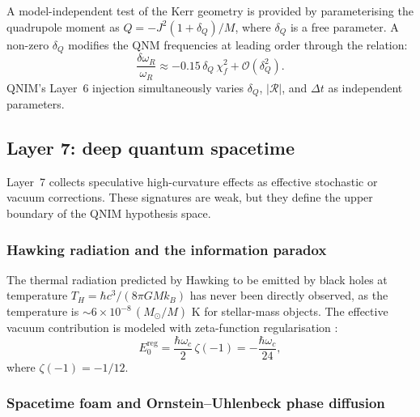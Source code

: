 \documentclass[11pt,a4paper, english]{book}
\theoremstyle{plain}
\theoremstyle{definition}
\numberwithin{equation}{chapter}
\numberwithin{figure}{chapter}
\numberwithin{table}{chapter}
\begin{document}
A model-independent test of the Kerr geometry is provided by parameterising
the quadrupole moment as $Q = -J^2(1+\delta_Q)/M$, where $\delta_Q$ is a
free parameter.  A non-zero $\delta_Q$ modifies the QNM frequencies at
leading order through the relation:
\begin{equation}
  \label{eq:nohair_deviation}
  \frac{\delta\omega_R}{\omega_R} \approx -0.15\,\delta_Q\,\chi_f^2
    + \mathcal{O}(\delta_Q^2).
\end{equation}
QNIM's Layer~6 injection simultaneously varies $\delta_Q$, $|\mathcal{R}|$,
and $\Delta t$ as independent parameters.

\subsection{Layer 7: deep quantum spacetime}
\label{subsec:layer7}

Layer~7 collects speculative high-curvature effects as effective stochastic or vacuum corrections. These signatures are weak, but they define the upper boundary of the QNIM hypothesis space.

\subsubsection{Hawking radiation and the information paradox}

The thermal radiation predicted by Hawking \citeyear{Hawking_1975} to be emitted
by black holes at temperature $T_H = \hbar c^3/(8\pi G M k_B)$ has never
been directly observed, as the temperature is $\sim 6\times10^{-8}\,(M_\odot/M)$
K for stellar-mass objects. The effective vacuum contribution is modeled with zeta-function regularisation \cite{Hawking_1975}:
\begin{equation}
  \label{eq:casimir_zeta}
  E_0^\mathrm{reg} = \frac{\hbar\omega_c}{2}\,\zeta(-1)
    = -\frac{\hbar\omega_c}{24},
\end{equation}
where $\zeta(-1)=-1/12$.

\subsubsection{Spacetime foam and Ornstein--Uhlenbeck phase diffusion}
\end{document}
